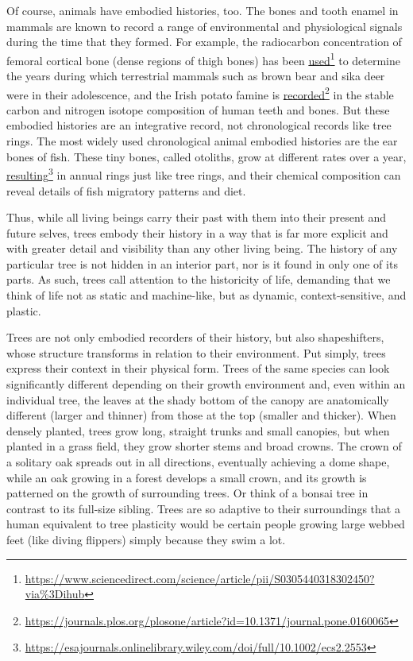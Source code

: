 \documentclass[../main.tex]{subfiles}
\begin{document}
\begin{multicols}{2}
{Of course, animals have embodied histories, too. The bones and tooth enamel in mammals are known to record a range of environmental and physiological signals during the time that they formed. For example, the radiocarbon concentration of femoral cortical bone (dense regions of thigh bones) has been \href{https://www.sciencedirect.com/science/article/pii/S0305440318302450?via\%3Dihub}{used}\footnote{\url{https://www.sciencedirect.com/science/article/pii/S0305440318302450?via\%3Dihub}} to determine the years during which terrestrial mammals such as brown bear and sika deer were in their adolescence, and the Irish potato famine is \href{https://journals.plos.org/plosone/article?id=10.1371/journal.pone.0160065}{recorded}\footnote{\url{https://journals.plos.org/plosone/article?id=10.1371/journal.pone.0160065}} in the stable carbon and nitrogen isotope composition of human teeth and bones. But these embodied histories are an integrative record, not chronological records like tree rings. The most widely used chronological animal embodied histories are the ear bones of fish. These tiny bones, called otoliths, grow at different rates over a year, \href{https://esajournals.onlinelibrary.wiley.com/doi/full/10.1002/ecs2.2553}{resulting}\footnote{\url{https://esajournals.onlinelibrary.wiley.com/doi/full/10.1002/ecs2.2553}} in annual rings just like tree rings, and their chemical composition can reveal details of fish migratory patterns and diet. 

Thus, while all living beings carry their past with them into their present and future selves, trees embody their history in a way that is far more explicit and with greater detail and visibility than any other living being. The history of any particular tree is not hidden in an interior part, nor is it found in only one of its parts. As such, trees call attention to the historicity of life, demanding that we think of life not as static and machine-like, but as dynamic, context-sensitive, and plastic. 

Trees are not only embodied recorders of their history, but also shapeshifters, whose structure transforms in relation to their environment. Put simply, trees express their context in their physical form. Trees of the same species can look significantly different depending on their growth environment and, even within an individual tree, the leaves at the shady bottom of the canopy are anatomically different (larger and thinner) from those at the top (smaller and thicker). When densely planted, trees grow long, straight trunks and small canopies, but when planted in a grass field, they grow shorter stems and broad crowns. The crown of a solitary oak spreads out in all directions, eventually achieving a dome shape, while an oak growing in a forest develops a small crown, and its growth is patterned on the growth of surrounding trees. Or think of a bonsai tree in contrast to its full-size sibling. Trees are so adaptive to their surroundings that a human equivalent to tree plasticity would be certain people growing large webbed feet (like diving flippers) simply because they swim a lot. 

}
\end{multicols}
\end{document}
